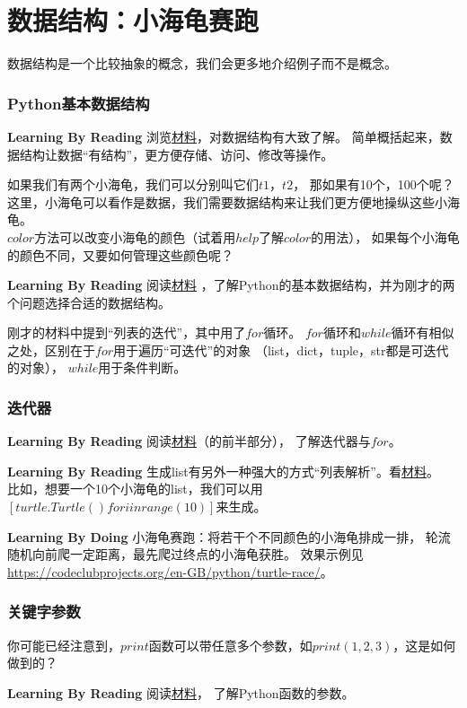 \chapter{数据结构：小海龟赛跑}
数据结构是一个比较抽象的概念，我们会更多地介绍例子而不是概念。
\subsection{Python基本数据结构}
\begin{paperbox}{\textbf{Learning By Reading}\starthree}
浏览\href{https://www.jianshu.com/p/75425f405c25}{材料}，对数据结构有大致了解。
简单概括起来，数据结构让数据“有结构”，更方便存储、访问、修改等操作。
\end{paperbox}
如果我们有两个小海龟，我们可以分别叫它们$t1$，$t2$，
那如果有10个，100个呢？\\
这里，小海龟可以看作是数据，我们需要数据结构来让我们更方便地操纵这些小海龟。\\
$color$方法可以改变小海龟的颜色（试着用$help$了解$color$的用法），
如果每个小海龟的颜色不同，又要如何管理这些颜色呢？\\
\begin{paperbox}{\textbf{Learning By Reading}\starfive}
阅读\href{http://blog.miskcoo.com/2016/07/python-fundamental-data-structures}{材料}
，了解Python的基本数据结构，并为刚才的两个问题选择合适的数据结构。
\end{paperbox}
刚才的材料中提到“列表的迭代”，其中用了$for$循环。
$for$循环和$while$循环有相似之处，区别在于$for$用于遍历“可迭代”的对象
（list，dict，tuple，str都是可迭代的对象），
$while$用于条件判断。
\subsection{迭代器}
\begin{paperbox}{\textbf{Learning By Reading}\starfive}
阅读\href{http://wiki.jikexueyuan.com/project/explore-python/Advanced-Features/iterator.html}{材料}（的前半部分），
了解迭代器与$for$。
\end{paperbox}
\begin{paperbox}{\textbf{Learning By Reading}\starfive}
生成list有另外一种强大的方式“列表解析”。看\href{http://codingpy.com/article/python-list-comprehensions-explained-visually/}{材料}。\\
比如，想要一个10个小海龟的list，我们可以用$[turtle.Turtle() for i in range(10)]$来生成。
\end{paperbox}
\begin{paperbox}{\textbf{Learning By Doing}\starthree}
小海龟赛跑：将若干个不同颜色的小海龟排成一排，
轮流随机向前爬一定距离，最先爬过终点的小海龟获胜。
效果示例见\url{https://codeclubprojects.org/en-GB/python/turtle-race/}。
\end{paperbox}
\subsection{关键字参数}
你可能已经注意到，$print$函数可以带任意多个参数，如$print(1, 2, 3)$，这是如何做到的？
\begin{paperbox}{\textbf{Learning By Reading}\starfive}
阅读\href{http://www.cnblogs.com/bingabcd/p/6671368.html}{材料}，
了解Python函数的参数。
\end{paperbox}
